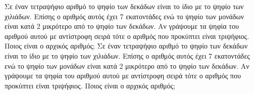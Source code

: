Σε έναν τετραψήφιο αριθμό το ψηφίο των δεκάδων είναι το ίδιο με το ψηφίο των χιλιάδων. Επίσης ο αριθμός αυτός έχει 7 εκατοντάδες ενώ το ψηφίο των μονάδων είναι κατά 2 μικρότερο από το ψηφίο των δεκάδων. Αν γράψουμε τα ψηφία του αριθμού αυτού με αντίστροφη σειρά τότε ο αριθμός που προκύπτει είναι τριψήφιος. Ποιος είναι ο αρχικός αριθμός;
Σε έναν τετραψήφιο αριθμό το ψηφίο των δεκάδων είναι το ίδιο με το ψηφίο των χιλιάδων. Επίσης ο αριθμός αυτός έχει 7 εκατοντάδες ενώ το ψηφίο των μονάδων είναι κατά 2 μικρότερο από το ψηφίο των δεκάδων. Αν γράψουμε τα ψηφία του αριθμού αυτού με αντίστροφη σειρά τότε ο αριθμός που προκύπτει είναι τριψήφιος. Ποιος είναι ο αρχικός αριθμός;
